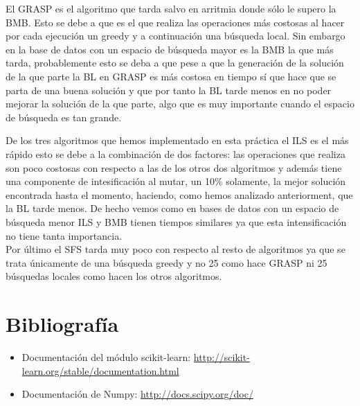 \documentclass[10pt,a4paper]{article}
\begin{document}
El GRASP es el algoritmo que tarda salvo en arritmia donde sólo le supero la BMB. Esto se debe a que es el que realiza las operaciones más costosas al hacer por cada ejecución un greedy y a continuación una búsqueda local. Sin embargo en la base de datos con un espacio de búsqueda mayor es la BMB la que más tarda, probablemente esto se deba a que pese a que la generación de la solución de la que parte la BL en GRASP es más costosa en tiempo sí que hace que se parta de una buena solución y que por tanto la BL tarde menos en no poder mejorar la solución de la que parte, algo que es muy importante cuando el espacio de búsqueda es tan grande.

De los tres algoritmos que hemos implementado en esta práctica el ILS es el más rápido esto se debe a la combinación de dos factores: las operaciones que realiza son poco costosas con respecto a las de los otros dos algoritmos y además tiene una componente de intesificación al mutar, un 10\% solamente, la mejor solución encontrada hasta el momento, haciendo, como hemos analizado anteriorment, que la BL tarde menos. De hecho vemos como en bases de datos con un espacio de búsqueda menor ILS y BMB tienen tiempos similares ya que esta intensificación no tiene tanta importancia.\\

Por último el SFS tarda muy poco con respecto al resto de algoritmos ya que se trata únicamente de una búsqueda greedy y no 25 como hace GRASP ni 25 búsquedas locales como hacen los otros algoritmos.\\

\newpage
\section{\color[rgb]{0.0,0.0,0.21}Bibliografía}

\begin{itemize}
\item Documentación del módulo scikit-learn: \url{http://scikit-learn.org/stable/documentation.html}
\item Documentación de Numpy: \url{http://docs.scipy.org/doc/}
\end{itemize}
\end{document}
